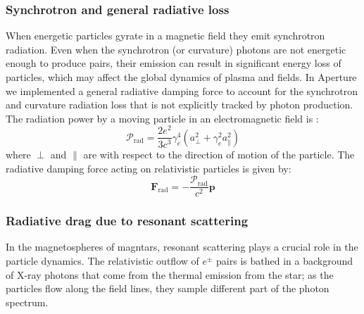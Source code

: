 \subsubsection{Synchrotron and general radiative loss}
\label{sec:synchrotron-loss}

When energetic particles gyrate in a magnetic field they emit synchrotron
radiation. Even when the synchrotron (or curvature) photons are not energetic
enough to produce pairs, their emission can result in significant energy loss of
particles, which may affect the global dynamics of plasma and fields.
In Aperture we implemented a general radiative damping force to account for the
synchrotron and curvature radiation loss that is not explicitly tracked by
photon production. The radiation power by a moving particle in an
electromagnetic field is \citep[see e.g.][]{longair_high_2011}:
\begin{equation}
  \label{eq:rad-power}
  \mathcal{P}_\mathrm{rad} = \frac{2e^2}{3c^3}\gamma_{e}^{4}(a_{\perp}^2+\gamma_{e}^2a_{\parallel}^2)
\end{equation}
where $\perp$ and $\parallel$ are with respect to the direction of motion of the
particle. The radiative damping force acting on relativistic particles is given by:
\begin{equation}
  \label{eq:rad-force}
  \mathbf{F}_\mathrm{rad} = -\frac{\mathcal{P}_\mathrm{rad}}{c^2}\mathbf{p}
\end{equation}


\subsubsection{Radiative drag due to resonant scattering}
\label{sec:resonant-scattering}

In the magnetospheres of magntars, resonant scattering plays a crucial role in
the particle dynamics. The relativistic outflow of $e^{\pm}$ pairs is bathed in
a background of X-ray photons that come from the thermal emission from the star;
as the particles flow along the field lines, they sample different part of the
photon spectrum.

